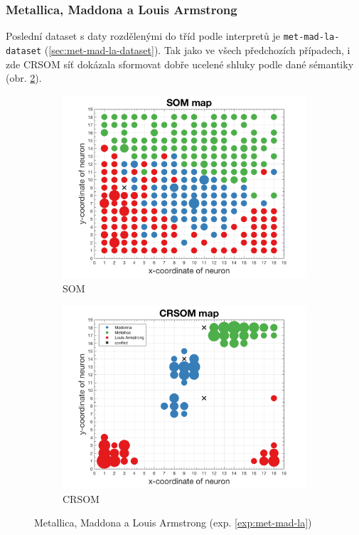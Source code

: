 \documentclass[thesis=M,czech]{FITthesis}[2012/06/26]
\begin{document}
\subsubsection*{Metallica, Maddona a Louis Armstrong}
Poslední dataset s daty rozdělenými do tříd podle interpretů je \texttt{met-mad-la-dataset} (\ref{sec:met-mad-la-dataset}). Tak jako ve všech předchozích případech, i zde CRSOM síť dokázala sformovat dobře ucelené shluky podle dané sémantiky (obr. \ref{fig:metmadlacrsom}). 

\begin{figure}
\centering
\begin{subfigure}{.5\textwidth}
  \centering
  \includegraphics[width=.99\linewidth]{exp_met_mad_la_som.png}
  \caption{SOM}
  \label{fig:sub1}
\end{subfigure}%
\begin{subfigure}{.5\textwidth}
  \centering
  \includegraphics[width=.99\linewidth]{exp_met_mad_la_crsom.png}
  \caption{CRSOM}
  \label{fig:metmadlacrsom}
\end{subfigure}
\caption{Metallica, Maddona a Louis Armstrong (exp. \ref{exp:met-mad-la})}
\label{fig:top}
\end{figure}
\end{document}
